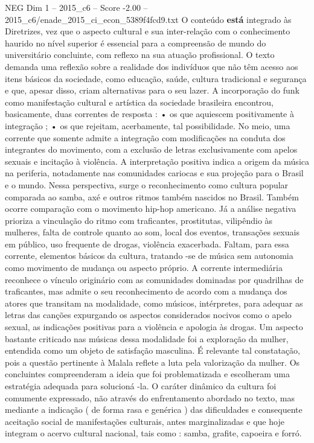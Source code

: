 \begin{textsample}{NEG Dim 1 – 2015\_c6 – Score -2.00 – 2015\_c6/enade\_2015\_ci\_econ\_5389f4fcd9.txt}
O conteúdo \textbf{está} integrado às Diretrizes, vez que o aspecto cultural e sua inter-relação com o conhecimento haurido no nível superior é essencial para a compreensão de mundo do universitário concluinte, com reflexo na sua atuação profissional.
O texto demanda uma reflexão sobre a realidade dos indivíduos que não têm acesso aos itens básicos da sociedade, como educação, saúde, cultura tradicional e segurança e que, apesar disso, criam alternativas para o seu lazer.
A incorporação do funk como manifestação cultural e artística da sociedade brasileira encontrou, basicamente, duas correntes de resposta : • os que aquiescem positivamente à integração ; • os que rejeitam, acerbamente, tal possibilidade.
No meio, uma corrente que somente admite a integração com modificações na conduta dos integrantes do movimento, com a exclusão de letras exclusivamente com apelos sexuais e incitação à violência.
A interpretação positiva indica a origem da música na periferia, notadamente nas comunidades cariocas e sua projeção para o Brasil e o mundo.
Nessa perspectiva, surge o reconhecimento como cultura popular comparada ao samba, axé e outros ritmos também nascidos no Brasil.
Também ocorre comparação com o movimento hip-hop americano.
Já a análise negativa prioriza a vinculação do ritmo com traficantes, prostitutas, vilipêndio às mulheres, falta de controle quanto ao som, local dos eventos, transações sexuais em público, uso frequente de drogas, violência exacerbada.
Faltam, para essa corrente, elementos básicos da cultura, tratando -se de música sem autonomia como movimento de mudança ou aspecto próprio.
A corrente intermediária reconhece o vínculo originário com as comunidades dominadas por quadrilhas de traficantes, mas admite o seu reconhecimento de acordo com a mudança dos atores que transitam na modalidade, como músicos, intérpretes, para adequar as letras das canções expurgando os aspectos considerados nocivos como o apelo sexual, as indicações positivas para a violência e apologia às drogas.
Um aspecto bastante criticado nas músicas dessa modalidade foi a exploração da mulher, entendida como um objeto de satisfação masculina.
É relevante tal constatação, pois a questão pertinente à Malala reflete a luta pela valorização da mulher.
Os concluintes compreenderam a ideia que foi problematizada e escolheram uma estratégia adequada para solucioná -la.
O caráter dinâmico da cultura foi comumente expressado, não através do enfrentamento abordado no texto, mas mediante a indicação ( de forma rasa e genérica ) das dificuldades e consequente aceitação social de manifestações culturais, antes marginalizadas e que hoje integram o acervo cultural nacional, tais como : samba, grafite, capoeira e forró.

\end{textsample}
